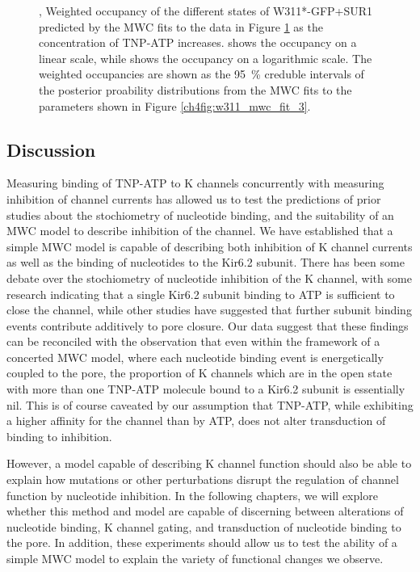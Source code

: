 \begin{figure}[h]
\begin{subfigure}[t]{0.45\textwidth}
	\end{subfigure}
	\caption[Comparing the states and weights of concerted and independent models]{
	,  Weighted occupancy of the different states of W311*-GFP+SUR1 predicted by the MWC fits to the data in Figure \ref{ch4fig:w311_model_comparison} as the concentration of TNP-ATP increases.
	 shows the occupancy on a linear scale, while  shows the occupancy on a logarithmic scale.
	The weighted occupancies are shown as the \SI{95}{\percent} creduble intervals of the posterior proability distributions from the MWC fits to the parameters shown in Figure \ref{ch4fig:w311_mwc_fit_3}.
	}\label{ch4fig:w311_model_comparison}
\end{figure}

\subsection{Discussion}

Measuring binding of TNP-ATP to K\ATP{} channels concurrently with measuring inhibition of channel currents has allowed us to test the predictions of prior studies about the stochiometry of nucleotide binding, and the suitability of an MWC model to describe inhibition of the channel.
We have established that a simple MWC model is capable of describing both inhibition of K\ATP{} channel currents as well as the binding of nucleotides to the Kir6.2 subunit.
There has been some debate over the stochiometry of nucleotide inhibition of the K\ATP{} channel, with some research indicating that a single Kir6.2 subunit binding to ATP is sufficient to close the channel, while other studies have suggested that further subunit binding events contribute additively to pore closure.
Our data suggest that these findings can be reconciled with the observation that even within the framework of a concerted MWC model, where each nucleotide binding event is energetically coupled to the pore, the proportion of K\ATP{} channels which are in the open state with more than one TNP-ATP molecule bound to a Kir6.2 subunit is essentially nil.
This is of course caveated by our assumption that TNP-ATP, while exhibiting a higher affinity for the channel than by ATP, does not alter transduction of binding to inhibition.

However, a model capable of describing K\ATP{} channel function should also be able to explain how mutations or other perturbations disrupt the regulation of channel function by nucleotide inhibition.
In the following chapters, we will explore whether this method and model are capable of discerning between alterations of nucleotide binding, K\ATP{} channel gating, and transduction of nucleotide binding to the pore.
In addition, these experiments should allow us to test the ability of a simple MWC model to explain the variety of functional changes we observe.

